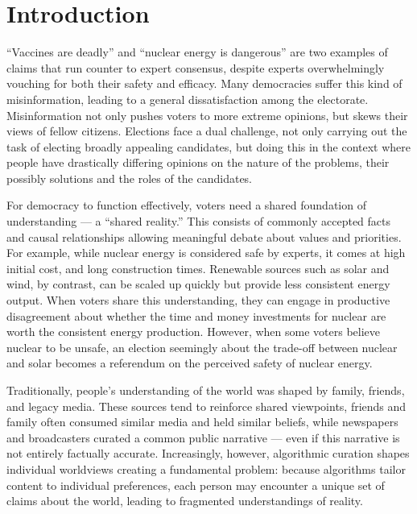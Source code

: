 \newpage
\chapter{Introduction}
\label{Introduction}

``Vaccines are deadly'' and ``nuclear energy is dangerous'' are two examples of
claims that run counter to expert consensus, despite experts overwhelmingly
vouching for both their safety and efficacy. Many democracies suffer this kind
of misinformation, leading to a general dissatisfaction among the electorate.
Misinformation not only pushes voters to more extreme opinions, but skews their
views of fellow citizens. Elections face a dual challenge, not only carrying
out the task of electing broadly appealing candidates, but doing this in the
context where people have drastically differing opinions on the nature of the
problems, their possibly solutions and the roles of the candidates.

For democracy to function effectively, voters need a shared foundation of
understanding --- a ``shared reality.'' This consists of commonly accepted
facts and causal relationships allowing meaningful debate about values and
priorities. For example, while nuclear energy is considered safe by experts, it
comes at high initial cost, and long construction times.
Renewable sources such as solar and wind, by contrast, can be scaled up quickly but provide less
consistent energy output. When voters share this understanding,
they can engage in productive disagreement about whether the time and money
investments for nuclear are worth the consistent energy production. However,
when some voters believe nuclear to be unsafe, an election seemingly about the
trade-off between nuclear and solar becomes a referendum on the perceived safety
of nuclear energy.

Traditionally, people's understanding of the world was shaped by family, friends,
and legacy media. These sources tend to reinforce shared viewpoints, friends
and family often consumed similar media and held similar beliefs, while
newspapers and broadcasters curated a common public narrative --- even if this narrative is not entirely factually accurate. Increasingly, however, algorithmic curation
shapes individual worldviews creating a fundamental problem: because algorithms
tailor content to individual preferences, each person may encounter a unique
set of claims about the world, leading to fragmented understandings of reality.

